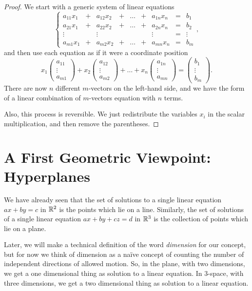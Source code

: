 \documentclass[00-livre-main.tex]{subfiles}
\begin{document}
\begin{proof}
We start with a generic system of linear equations
\[
\left\{\begin{array}{rrrrrrrrr}
a_{11} x_1 & + & a_{12} x_2 & + & \dots & + & a_{1n} x_n & = & b_1 \\
a_{21} x_1 & + & a_{22} x_2 & + & \dots & + & a_{2n} x_n & = & b_2 \\
\vdots & & \vdots & & & & \vdots & = & \vdots \\
a_{m1} x_1 & + & a_{m2} x_2 & + & \dots & + & a_{mn} x_n & = & b_m 
\end{array}\right. ,
\]
and then use each equation as if it were a coordinate position
\[
x_1 \begin{pmatrix} a_{11}\\ \vdots \\ a_{m1} \end{pmatrix} + 
x_2 \begin{pmatrix} a_{12}\\ \vdots \\ a_{m2} \end{pmatrix} +
\dots +
x_n \begin{pmatrix} a_{1n}\\ \vdots \\ a_{mn} \end{pmatrix} = 
\begin{pmatrix} b_1\\ \vdots \\ b_m \end{pmatrix} .
\]
There are now $n$ different $m$-vectors on the left-hand side, and we have the form of a linear combination of $m$-vectors equation with $n$ terms.

Also, this process is reversible. We just redistribute the variables $x_i$ in the
scalar multiplication, and then remove the parentheses. 
\end{proof}


\section*{A First Geometric Viewpoint: Hyperplanes}

We have already seen that the set of solutions to a single linear equation $ax+by=c$ in $\mathbb{R}^2$ is the points which lie on a line. Similarly, the set of solutions of a single linear equation $ax+by+cz=d$ in $\mathbb{R}^3$ is the collection of points which lie on a plane. 

Later, we will make a technical definition of the word \emph{dimension} for our concept, but for now we think of dimension as a na\"ive concept of counting the number of independent directions of allowed motion. So, in the plane, with two dimensions, we get a one dimensional thing as solution to a linear equation. In $3$-space, with three dimensions, we get a two dimensional thing as solution to a linear equation.
\end{document}
